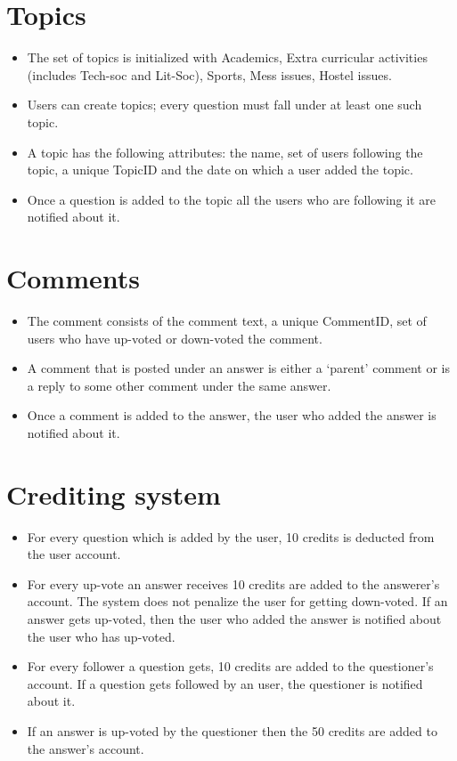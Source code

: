 \documentclass{article}
\begin{document}
\section{Topics}
\begin{itemize}
\item The set of topics is initialized with Academics, Extra curricular activities (includes Tech-soc and Lit-Soc), Sports, Mess issues, Hostel issues.
\item Users can create topics; every question must fall under at least one such topic.
\item A topic has the following attributes: the name, set of users following the topic, a unique TopicID and the date on which a user added the topic.
\item Once a question is added to the topic all the users who are following it are notified about it.

\end{itemize} 

\section{Comments}
\begin{itemize}
\item The comment consists of the comment text, a unique CommentID, set of users who have up-voted or down-voted the comment.
\item A comment that is posted under an answer is either a ‘parent’ comment or is a reply to some other comment under the same answer.
\item Once a comment is added to the answer, the user who added the answer is notified about it.

\end{itemize}
\section{Crediting system}
\begin{itemize}
\item For every question which is added by the user, 10 credits is deducted from the user account.
\item For every up-vote an answer receives 10 credits are added to the answerer's account. The system does not penalize the user for getting down-voted. If an answer gets up-voted, then the user who added the answer is notified about the user who has up-voted. 
\item For every follower a question gets, 10 credits are added to the questioner's account. If a question gets followed by an user, the questioner is notified about it.
\item If an answer is up-voted by the questioner then the 50 credits are added to the answer's account.
\end{itemize}
\end{document}
